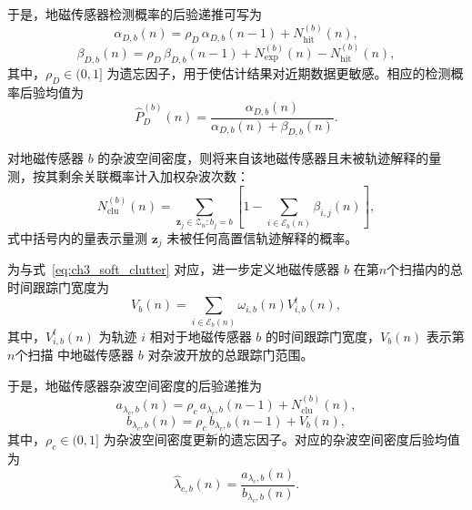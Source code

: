 \documentclass{xdupgthesis}
\begin{document}
于是，地磁传感器检测概率的后验递推可写为
\begin{equation}
	\alpha_{D,b}(n)
	=
	\rho_D\,\alpha_{D,b}(n-1)+N_{\mathrm{hit}}^{(b)}(n),
	\label{eq:ch3_alpha_update}
\end{equation}
\begin{equation}
	\beta_{D,b}(n)
	=
	\rho_D\,\beta_{D,b}(n-1)+N_{\mathrm{exp}}^{(b)}(n)-N_{\mathrm{hit}}^{(b)}(n),
	\label{eq:ch3_beta_update}
\end{equation}
其中，$\rho_D\in(0,1]$ 为遗忘因子，用于使估计结果对近期数据更敏感。相应的检测概率后验均值为
\begin{equation}
	\hat P_D^{(b)}(n)
	=
	\frac{\alpha_{D,b}(n)}{\alpha_{D,b}(n)+\beta_{D,b}(n)}.
	\label{eq:ch3_pD_mean}
\end{equation}

对地磁传感器 $b$ 的杂波空间密度，则将来自该地磁传感器且未被轨迹解释的量测，按其剩余关联概率计入加权杂波次数：
\begin{equation}
	N_{\mathrm{clu}}^{(b)}(n)
	=
	\sum_{\mathbf z_j\in \mathcal Z_n:b_j=b}
	\left[
	1-\sum_{i\in\mathcal E_b(n)}\beta_{i,j}(n)
	\right],
	\label{eq:ch3_soft_clutter}
\end{equation}
式中括号内的量表示量测 $\mathbf z_j$ 未被任何高置信轨迹解释的概率。

为与式~\eqref{eq:ch3_soft_clutter} 对应，进一步定义地磁传感器 $b$ 在第$n$个扫描内的总时间跟踪门宽度为
\begin{equation}
	V_b(n)
	=
	\sum_{i\in\mathcal E_b(n)}
	\omega_{i,b}(n)V^{t}_{i,b}(n),
	\label{eq:ch3_exposure_volume}
\end{equation}
其中，$V^{t}_{i,b}(n)$ 为轨迹 $i$ 相对于地磁传感器 $b$ 的时间跟踪门宽度，$V_b(n)$ 表示第$n$个扫描 中地磁传感器 $b$ 对杂波开放的总跟踪门范围。

于是，地磁传感器杂波空间密度的后验递推为
\begin{equation}
	a_{\lambda_c,b}(n)
	=
	\rho_c\, a_{\lambda_c,b}(n-1)+N_{\mathrm{clu}}^{(b)}(n),
	\label{eq:ch3_a_lambda_update}
\end{equation}
\begin{equation}
	b_{\lambda_c,b}(n)
	=
	\rho_c\, b_{\lambda_c,b}(n-1)+V_b(n),
	\label{eq:ch3_b_lambda_update}
\end{equation}
其中，$\rho_c\in(0,1]$ 为杂波空间密度更新的遗忘因子。对应的杂波空间密度后验均值为
\begin{equation}
	\hat\lambda_{c,b}(n)
	=
	\frac{a_{\lambda_c,b}(n)}{b_{\lambda_c,b}(n)}.
	\label{eq:ch3_kappa_mean_v2}
\end{equation}
\end{document}
